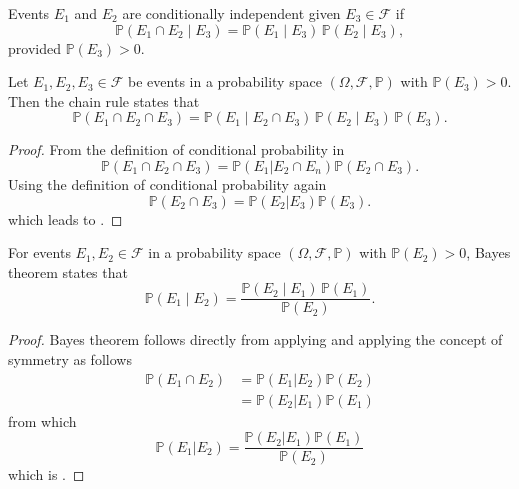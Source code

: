 \begin{definition}
	\label{def:conditional_independence}
	Events $E_1$ and $E_2$ are conditionally independent given $E_3 \in \mathcal{F}$ if
	\begin{equation}
		\mathbb{P}(E_1 \cap E_2 \mid E_3) = \mathbb{P}(E_1 \mid E_3)\,\mathbb{P}(E_2 \mid E_3),
	\end{equation}
	provided $\mathbb{P}(E_3) > 0$.
\end{definition}

\begin{theorem}
	\label{theorem:chain_rule}
	Let $E_1, E_2, E_3 \in \mathcal{F}$ be events in a probability space $(\Omega, \mathcal{F}, \mathbb{P})$ with $\mathbb{P}(E_3) > 0$. Then the chain rule states that
	\begin{equation}
		\mathbb{P}(E_1 \cap E_2 \cap E_3) 
		= \mathbb{P}(E_1 \mid E_2 \cap E_3)\,\mathbb{P}(E_2 \mid E_3)\,\mathbb{P}(E_3).
	\end{equation}
\end{theorem}
\begin{proof}
	From the definition of conditional probability in 
	\begin{equation}
		\mathbb{P}(E_1 \cap E_2 \cap E_3) = \mathbb{P}(E_1|E_2 \cap E_n)\mathbb{P}(E_2 \cap E_3).
		\label{eq:p1}
	\end{equation}
	Using the definition of conditional probability again
	\begin{equation}
		\mathbb{P}(E_2 \cap E_3) = \mathbb{P}(E_2| E_3)\mathbb{P}(E_3).
	\end{equation}
	which leads to .
\end{proof}

\begin{theorem}
	\label{theorem:bayes_theorem}
	For events $E_1, E_2 \in \mathcal{F}$ in a probability space $(\Omega, \mathcal{F}, \mathbb{P})$ with $\mathbb{P}(E_2) > 0$, Bayes theorem states that
	\begin{equation}
		\mathbb{P}(E_1 \mid E_2) = \frac{\mathbb{P}(E_2 \mid E_1)\,\mathbb{P}(E_1)}{\mathbb{P}(E_2)}.
		\label{bayes_theorem}
	\end{equation}
\end{theorem}


\begin{proof}
	Bayes theorem follows directly from applying  and applying the concept of symmetry as follows
	\begin{equation}
		\begin{split}
			\mathbb{P}(E_1 \cap E_2) &= \mathbb{P}(E_1| E_2)\mathbb{P}(E_2) \\
			& = \mathbb{P}(E_2|E_1)\mathbb{P}(E_1)
		\end{split}
		\label{eq:c2}
	\end{equation}
	from which
	\begin{equation}
		\mathbb{P}(E_1| E_2) = \frac{\mathbb{P}(E_2| E_1)\mathbb{P}(E_1)}{\mathbb{P}(E_2)}
	\end{equation}
	which is .
\end{proof}

